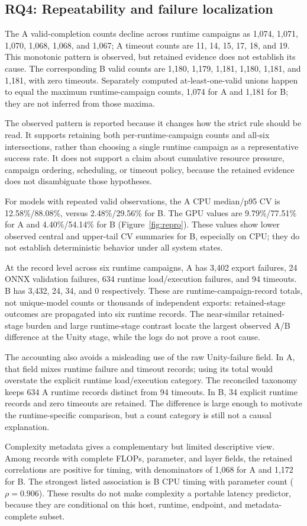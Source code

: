 \subsection{RQ4: Repeatability and failure localization}
The A valid-completion counts decline across runtime campaigns as 1,074, 1,071, 1,070, 1,068, 1,068, and 1,067; A timeout counts are 11, 14, 15, 17, 18, and 19. This monotonic pattern is observed, but retained evidence does not establish its cause. The corresponding B valid counts are 1,180, 1,179, 1,181, 1,180, 1,181, and 1,181, with zero timeouts. Separately computed at-least-one-valid unions happen to equal the maximum runtime-campaign counts, 1,074 for A and 1,181 for B; they are not inferred from those maxima.

The observed pattern is reported because it changes how the strict rule should be read. It supports retaining both per-runtime-campaign counts and all-six intersections, rather than choosing a single runtime campaign as a representative success rate. It does not support a claim about cumulative resource pressure, campaign ordering, scheduling, or timeout policy, because the retained evidence does not disambiguate those hypotheses.

For models with repeated valid observations, the A CPU median/p95 CV is 12.58\%/88.08\%, versus 2.48\%/29.56\% for B. The GPU values are 9.79\%/77.51\% for A and 4.40\%/54.14\% for B (Figure~\ref{fig:repro}). These values show lower observed central and upper-tail CV summaries for B, especially on CPU; they do not establish deterministic behavior under all system states.

At the record level across six runtime campaigns, A has 3,402 export failures, 24 ONNX validation failures, 634 runtime load/execution failures, and 94 timeouts. B has 3,432, 24, 34, and 0 respectively. These are runtime-campaign-record totals, not unique-model counts or thousands of independent exports: retained-stage outcomes are propagated into six runtime records. The near-similar retained-stage burden and large runtime-stage contrast locate the largest observed A/B difference at the Unity stage, while the logs do not prove a root cause.

The accounting also avoids a misleading use of the raw Unity-failure field. In A, that field mixes runtime failure and timeout records; using its total would overstate the explicit runtime load/execution category. The reconciled taxonomy keeps 634 A runtime records distinct from 94 timeouts. In B, 34 explicit runtime records and zero timeouts are retained. The difference is large enough to motivate the runtime-specific comparison, but a count category is still not a causal explanation.

Complexity metadata gives a complementary but limited descriptive view. Among records with complete FLOPs, parameter, and layer fields, the retained correlations are positive for timing, with denominators of 1,068 for A and 1,172 for B. The strongest listed association is B CPU timing with parameter count ($\rho=0.906$). These results do not make complexity a portable latency predictor, because they are conditional on this host, runtime, endpoint, and metadata-complete subset.

\ReproFigure
